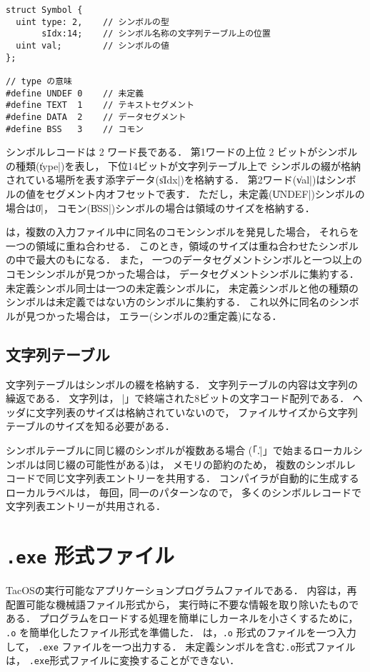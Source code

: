 \begin{lstlisting}[numbers=none,float=htb]
struct Symbol {
  uint type: 2,    // シンボルの型
       sIdx:14;    // シンボル名称の文字列テーブル上の位置
  uint val;        // シンボルの値
};

// type の意味
#define UNDEF 0    // 未定義
#define TEXT  1    // テキストセグメント
#define DATA  2    // データセグメント
#define BSS   3    // コモン
\end{lstlisting}

シンボルレコードは 2 ワード長である．
第1ワードの上位 2 ビットがシンボルの種類(\|type|)を表し，
下位14ビットが文字列テーブル上で
シンボルの綴が格納されている場所を表す添字データ(\|sIdx|)を格納する．
第2ワード(\|val|)はシンボルの値をセグメント内オフセットで表す．
ただし，未定義(\|UNDEF|)シンボルの場合は\|0|，
コモン(\|BSS|)シンボルの場合は領域のサイズを格納する．

{\ld}は，複数の入力ファイル中に同名のコモンシンボルを発見した場合，
それらを一つの領域に重ね合わせる．
このとき，領域のサイズは重ね合わせたシンボルの中で最大のもになる．
また，
一つのデータセグメントシンボルと一つ以上のコモンシンボルが見つかった場合は，
データセグメントシンボルに集約する．
未定義シンボル同士は一つの未定義シンボルに，
未定義シンボルと他の種類のシンボルは未定義ではない方のシンボルに集約する．
これ以外に同名のシンボルが見つかった場合は，
エラー(シンボルの2重定義)になる．

\subsection{文字列テーブル}
文字列テーブルはシンボルの綴を格納する．
文字列テーブルの内容は{\cmml}文字列の繰返である．
{\cmml}文字列は，「\|\0|」で終端された8ビットの文字コード配列である．
ヘッダに文字列表のサイズは格納されていないので，
ファイルサイズから文字列テーブルのサイズを知る必要がある．

シンボルテーブルに同じ綴のシンボルが複数ある場合
(「\|.|」で始まるローカルシンボルは同じ綴の可能性がある)は，
メモリの節約のため，
複数のシンボルレコードで同じ文字列表エントリーを共用する．
{\cmm}コンパイラが自動的に生成するローカルラベルは，
毎回，同一のパターンなので，
多くのシンボルレコードで文字列表エントリーが共用される．

\section{\texttt{.exe} 形式ファイル}
TacOSの実行可能なアプリケーションプログラムファイルである．
内容は，再配置可能な機械語ファイル形式から，
実行時に不要な情報を取り除いたものである．
プログラムをロードする処理を簡単にしカーネルを小さくするために，
\texttt{.o} を簡単化したファイル形式を準備した．
{\objexe}は，\texttt{.o} 形式のファイルを一つ入力して，
\texttt{.exe} ファイルを一つ出力する．
未定義シンボルを含む\texttt{.o}形式ファイルは，
\texttt{.exe}形式ファイルに変換することができない．

